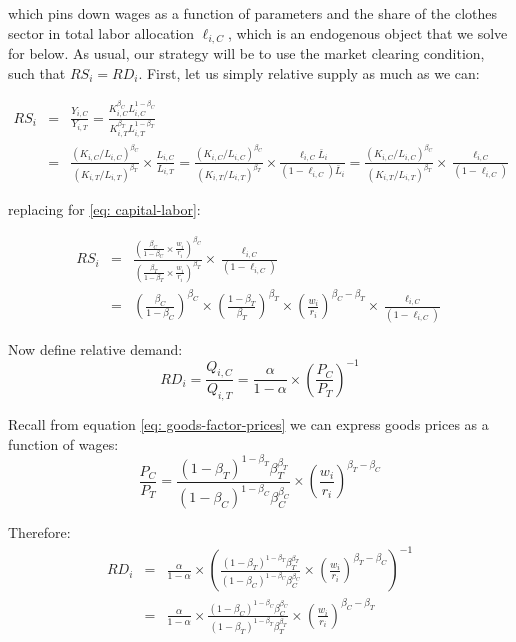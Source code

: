 \documentclass[11pt,letterpaper]{article}
\begin{document}
\noindent which pins down wages as a function of parameters and the share of the clothes sector in total labor allocation $\ell_{i,C}$, which is an endogenous object that we solve for below. As usual, our strategy will be to use the market clearing condition, such that $RS_i = RD_i$. First, let us simply relative supply as much as we can:

\begin{eqnarray*}
    RS_i &=& \frac{Y_{i,C}}{Y_{i,T}} = \frac{K_{i,C}^{\beta_C}L_{i,C}^{1-\beta_C} }{K_{i,T}^{\beta_T}L_{i,T}^{1-\beta_T}} \\
    &=& \frac{(K_{i,C}/L_{i,C})^{\beta_C}}{(K_{i,T}/L_{i,T})^{\beta_T}} \times \frac{L_{i,C}}{L_{i,T}} = \frac{(K_{i,C}/L_{i,C})^{\beta_C}}{(K_{i,T}/L_{i,T})^{\beta_T}}  \times \frac{\ell_{i,C} \bar{L}_i}{(1-\ell_{i,C}) \bar{L}_i} = \frac{(K_{i,C}/L_{i,C})^{\beta_C}}{(K_{i,T}/L_{i,T})^{\beta_T}}  \times \frac{\ell_{i,C} }{(1-\ell_{i,C})}
\end{eqnarray*}


\noindent replacing for \eqref{eq: capital-labor}:

\begin{eqnarray*}
    RS_i &=&  \frac{\left( \frac{\beta_C}{1-\beta_C} \times \frac{w_i}{r_i} \right)^{\beta_C}}{\left( \frac{\beta_T}{1-\beta_T} \times \frac{w_i}{r_i} \right)^{\beta_T}}  \times \frac{\ell_{i,C} }{(1-\ell_{i,C})} \\ 
    &=& \left( \frac{\beta_C}{1-\beta_C} \right)^{\beta_C} \times \left( \frac{1-\beta_T}{\beta_T} \right)^{\beta_T} \times \left( \frac{w_i}{r_i} \right)^{\beta_C-\beta_T}  \times \frac{\ell_{i,C} }{(1-\ell_{i,C})} 
\end{eqnarray*}

Now define relative demand:
\begin{equation*}
    RD_i = \frac{Q_{i,C}}{Q_{i,T}} = \frac{\alpha}{1-\alpha} \times \left( \frac{P_C}{P_T} \right)^{-1} 
\end{equation*}

Recall from equation \eqref{eq: goods-factor-prices} we can express goods prices as a function of wages:
\begin{equation*}
    \frac{P_C}{P_T} = \frac{(1-\beta_T)^{1-\beta_T} \beta_T^{\beta_T}}{ (1-\beta_C)^{1-\beta_C} \beta_C^{\beta_C} } \times \left(  \frac{w_i}{r_i} \right)^{\beta_T - \beta_C}
\end{equation*}

Therefore:
\begin{eqnarray*}
    RD_i &=&  \frac{\alpha}{1-\alpha} \times \left(   \frac{(1-\beta_T)^{1-\beta_T} \beta_T^{\beta_T}}{ (1-\beta_C)^{1-\beta_C} \beta_C^{\beta_C} } \times \left(  \frac{w_i}{r_i} \right)^{\beta_T - \beta_C} \right)^{-1}  \\
    &=& \frac{\alpha}{1-\alpha} \times \frac{ (1-\beta_C)^{1-\beta_C} \beta_C^{\beta_C} }{(1-\beta_T)^{1-\beta_T} \beta_T^{\beta_T}} \times \left(  \frac{w_i}{r_i} \right)^{\beta_C-\beta_T }  
\end{eqnarray*}
\end{document}
